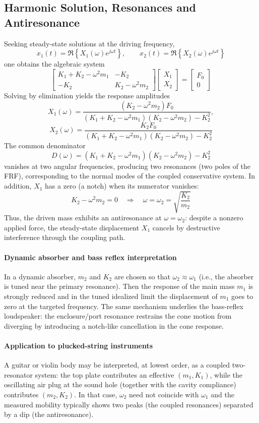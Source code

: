 \subsection{Harmonic Solution, Resonances and Antiresonance}

Seeking steady-state solutions at the driving frequency,
\[
x_1(t) = \Re\left\{X_1(\omega)e^{j\omega t}\right\},
\qquad
x_2(t) = \Re\left\{X_2(\omega)e^{j\omega t}\right\}
\]
one obtains the algebraic system
\[
\begin{bmatrix}
K_1 + K_2 - \omega^2 m_1 & - K_2\\
 - K_2 & K_2 - \omega^2 m_2
\end{bmatrix}
\begin{bmatrix}
X_1 \\ X_2
\end{bmatrix}
 = 
\begin{bmatrix}
F_0 \\ 0
\end{bmatrix}
\]
Solving by elimination yields the response amplitudes
\[
X_1(\omega) = 
\frac{(K_2 - \omega^2 m_2)F_0}
{(K_1 + K_2 - \omega^2 m_1)(K_2 - \omega^2 m_2) - K_2^2},
\]
\[
X_2(\omega) = 
\frac{K_2 F_0}
{(K_1 + K_2 - \omega^2 m_1)(K_2 - \omega^2 m_2) - K_2^2}
\]
The common denominator
\[
D(\omega) = (K_1 + K_2 - \omega^2 m_1)(K_2 - \omega^2 m_2) - K_2^2
\]
vanishes at two angular frequencies, producing two resonances (two poles of the FRF), corresponding to the normal modes of the coupled conservative system. In addition, \( X_1 \) has a zero (a notch) when its numerator vanishes:
\[
K_2 - \omega^2 m_2 = 0
\quad\Longrightarrow\quad
\omega = \omega_2 = \sqrt{\frac{K_2}{m_2}}
\]
Thus, the driven mass exhibits an antiresonance at \( \omega = \omega_2 \): despite a nonzero applied force, the steady-state displacement \( X_1 \) cancels by destructive interference through the coupling path.

\paragraph{Dynamic absorber and bass reflex interpretation} In a dynamic absorber, \( m_2 \) and \( K_2 \) are chosen so that \( \omega_2 \approx \omega_1 \) (i.e., the absorber is tuned near the primary resonance). Then the response of the main mass \( m_1 \) is strongly reduced and in the tuned idealized limit the displacement of \( m_1 \) goes to zero at the targeted frequency. The same mechanism underlies the bass-reflex loudspeaker: the enclosure/port resonance restrains the cone motion from diverging by introducing a notch-like cancellation in the cone response. 

\paragraph{Application to plucked-string instruments} A guitar or violin body may be interpreted, at lowest order, as a coupled two-resonator system: the top plate contributes an effective \( (m_1,K_1) \), while the oscillating air plug at the sound hole (together with the cavity compliance) contributes \( (m_2,K_2) \). In that case, \( \omega_2 \) need not coincide with \( \omega_1 \) and the measured mobility typically shows two peaks (the coupled resonances) separated by a dip (the antiresonance). 
